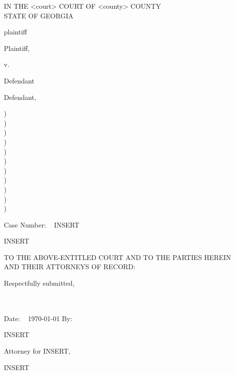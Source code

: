 \documentclass{article}
\newcommand{\tab}{\hspace*{.5in}}
\newenvironment{tightcenter}{%
	\setlength\topsep{0pt}
	\setlength\parskip{0pt}
		\begin{center}
		}{%
		\end{center}
		}
\begin{document}

\begin{tightcenter}
IN THE <court> COURT OF <county> COUNTY \\ STATE OF GEORGIA
\end{tightcenter}

\vspace*{16.25mm}

	{
\begin{minipage}[t]{3in}

{plaintiff}

\tab \tab \tab Plaintiff,

\tab \tab v.

{Defendant}

\tab \tab \tab Defendant,

\makebox[3in]{\hrulefill}

\end{minipage}
	\begin{minipage}[t]{5mm}
		\begin{singlespace*}
			)\\)\\)\\)\\)\\)\\)\\)\\)\\)\\)
		\end{singlespace*}
	\end{minipage}
\begin{minipage}[t]{3in}

Case Number: ~ INSERT

INSERT


\end{minipage}
	}

\vspace{5mm}

\tab TO THE ABOVE-ENTITLED COURT AND TO THE PARTIES HEREIN AND THEIR ATTORNEYS OF RECORD:


\hspace*{3in}Respectfully submitted,\\

~\\
~\\

\begin{singlespace*}

Date: ~ \today \hspace*{30mm} By: ~ \makebox[3in]{\hrulefill}

\hspace*{3.5in}INSERT

\hspace*{3.5in}Attorney for INSERT,

\hspace*{3.5in}INSERT

\end{singlespace*}
\end{document}
